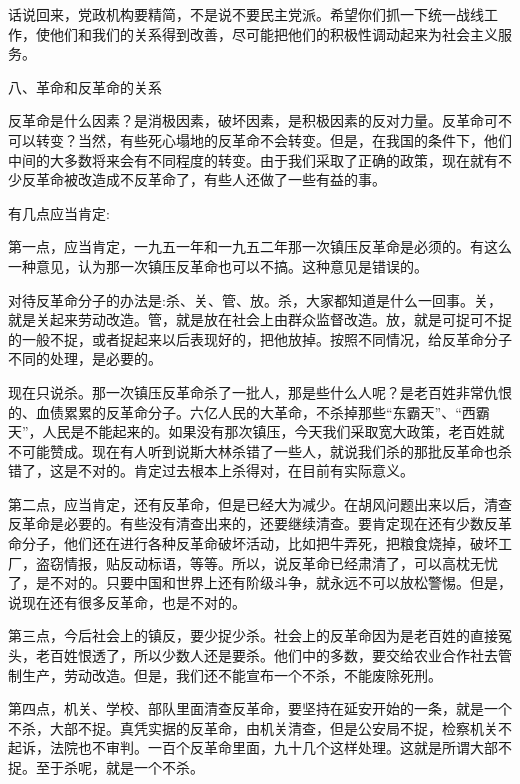 \documentclass[UTF8, 12pt, a4paper]{ctexrep}
\begin{document}
话说回来，党政机构要精简，不是说不要民主党派。希望你们抓一下统一战线工作，使他们和我们的关系得到改善，尽可能把他们的积极性调动起来为社会主义服务。

八、革命和反革命的关系

反革命是什么因素？是消极因素，破坏因素，是积极因素的反对力量。反革命可不可以转变？当然，有些死心塌地的反革命不会转变。但是，在我国的条件下，他们中间的大多数将来会有不同程度的转变。由于我们采取了正确的政策，现在就有不少反革命被改造成不反革命了，有些人还做了一些有益的事。

有几点应当肯定:

第一点，应当肯定，一九五一年和一九五二年那一次镇压反革命是必须的。有这么一种意见，认为那一次镇压反革命也可以不搞。这种意见是错误的。

对待反革命分子的办法是:杀、关、管、放。杀，大家都知道是什么一回事。关，就是关起来劳动改造。管，就是放在社会上由群众监督改造。放，就是可捉可不捉的一般不捉，或者捉起来以后表现好的，把他放掉。按照不同情况，给反革命分子不同的处理，是必要的。

现在只说杀。那一次镇压反革命杀了一批人，那是些什么人呢？是老百姓非常仇恨的、血债累累的反革命分子。六亿人民的大革命，不杀掉那些“东霸天”、“西霸天”，人民是不能起来的。如果没有那次镇压，今天我们采取宽大政策，老百姓就不可能赞成。现在有人听到说斯大林杀错了一些人，就说我们杀的那批反革命也杀错了，这是不对的。肯定过去根本上杀得对，在目前有实际意义。

第二点，应当肯定，还有反革命，但是已经大为减少。在胡风问题出来以后，清查反革命是必要的。有些没有清查出来的，还要继续清查。要肯定现在还有少数反革命分子，他们还在进行各种反革命破坏活动，比如把牛弄死，把粮食烧掉，破坏工厂，盗窃情报，贴反动标语，等等。所以，说反革命已经肃清了，可以高枕无忧了，是不对的。只要中国和世界上还有阶级斗争，就永远不可以放松警惕。但是，说现在还有很多反革命，也是不对的。

第三点，今后社会上的镇反，要少捉少杀。社会上的反革命因为是老百姓的直接冤头，老百姓恨透了，所以少数人还是要杀。他们中的多数，要交给农业合作社去管制生产，劳动改造。但是，我们还不能宣布一个不杀，不能废除死刑。

第四点，机关、学校、部队里面清查反革命，要坚持在延安开始的一条，就是一个不杀，大部不捉。真凭实据的反革命，由机关清查，但是公安局不捉，检察机关不起诉，法院也不审判。一百个反革命里面，九十几个这样处理。这就是所谓大部不捉。至于杀呢，就是一个不杀。
\end{document}
